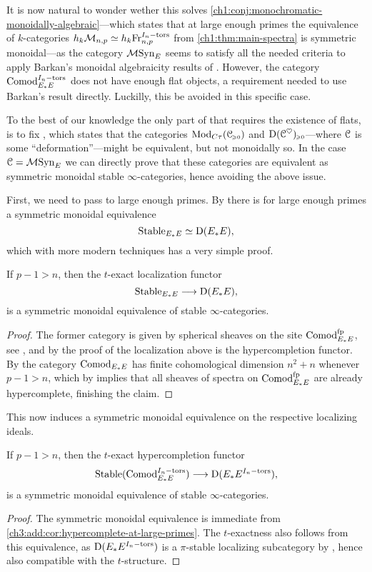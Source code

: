 It is now natural to wonder wether this solves \cref{ch1:conj:monochromatic-monoidally-algebraic}---which states that at large enough primes the equivalence of $k$-categories $h_k\mathcal{M}_{n,p} \simeq h_k\mathrm{Fr}_{n,p}^{I_n-\mathrm{tors}}$ from \cref{ch1:thm:main-spectra} is symmetric monoidal---as the category $\mathcal{M}\mathrm{Syn}_{E}$ seems to satisfy all the needed criteria to apply Barkan's monoidal algebraicity results of \cite{barkan_2023}. However, the category $\mathrm{Comod}_{E_*E}^{I_n-\mathrm{tors}}$ does not have enough flat objects, a requirement needed to use Barkan's result directly. Luckilly, this be avoided in this specific case. 

To the best of our knowledge the only part of \cite[Theorem H]{barkan_2023} that requires the existence of flats, is to fix \cite[Warning 3..30]{barkan_2023}, which states that the categories $\mathrm{Mod}_{C\tau}(\EuScript{C}_{\hspace{-1pt}\scriptscriptstyle\geqslant 0})$ and $\mathrm{D}(\EuScript{C}^\heartsuit)_{\hspace{-1pt}\scriptscriptstyle\geqslant 0}$---where $\EuScript{C}$ is some ``deformation''---might be equivalent, but not monoidally so. In the case $\EuScript{C}= \mathcal{M}\mathrm{Syn}_{E}$ we can directly prove that these categories are equivalent as symmetric monoidal stable $\infty$-categories, hence avoiding the above issue. 

First, we need to pass to large enough primes. By \cite[4.11]{barthel-heard_2018} there is for large enough primes a symmetric monoidal equivalence
\[\mathrm{Stable}_{E_*E} \simeq \mathrm{D}(E_*E),\]
which with more modern techniques has a very simple proof. 

\begin{lemma}
    \label{ch3:add:cor:hypercomplete-at-large-primes}
    If $p-1>n$, then the $t$-exact localization functor
    \[\mathrm{Stable}_{E_*E} \longrightarrow \mathrm{D}(E_*E),\]
    is a symmetric monoidal equivalence of stable $\infty$-categories.  
\end{lemma}
\begin{proof}
    The former category is given by spherical sheaves on the site $\mathrm{Comod}_{E_*E}^{\mathrm{fp}}$, see \cite[3.7]{pstragowski_2022}, and by the proof of \cite[4.54]{pstragowski_2022} the localization above is the hypercompletion functor. By \cite[2.5]{pstragowski_2021} the category $\mathrm{Comod}_{E_*E}$ has finite cohomological dimension $n^2+n$ whenever $p-1>n$, which by \cite[2.10]{clausen-mathew_2021} implies that all sheaves of spectra on $\mathrm{Comod}_{E_*E}^{\mathrm{fp}}$ are already hypercomplete, finishing the claim. 
\end{proof}

This now induces a symmetric monoidal equivalence on the respective localizing ideals. 

\begin{corollary}
    \label{ch3:add:cor:torsion-hypercomplete-at-large-primes}
    If $p-1> n$, then the $t$-exact hypercompletion functor
    \[\mathrm{Stable}(\mathrm{Comod}_{E_*E}^{I_n-\mathrm{tors}}) \longrightarrow \mathrm{D}(E_*E^{I_n-\mathrm{tors}}),\]
    is a symmetric monoidal equivalence of stable $\infty$-categories.  
\end{corollary}
\begin{proof}
    The symmetric monoidal equivalence is immediate from \cref{ch3:add:cor:hypercomplete-at-large-primes}. The $t$-exactness also follows from this equivalence, as $\mathrm{D}(E_*E^{I_n-\mathrm{tors}})$ is a $\pi$-stable localizing subcategory by \cite[3.7(2)]{barthel-heard-valenzuela_2020}, hence also compatible with the $t$-structure. 
\end{proof}

